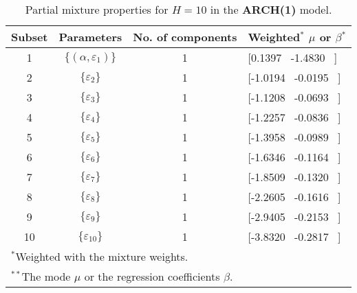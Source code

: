 \footnotesize{  
{ \renewcommand{\arraystretch}{1.3} 
\begin{longtable}{cccp{3.6cm}} 
\caption{Partial mixture properties for $H=10$ in the \textbf{ARCH(1)} model.} 
\label{tab:pmits_arch} \\ 
 Subset & Parameters & No. of components  & Weighted$^{*}$ $\mu$ or $\beta$$^{*}$ \\ \hline 
1 & $\{(\alpha,\varepsilon_{1})\}$ & 1 & [0.1397 \, -1.4830 \, ]   \\ [1ex] 
2 & $\{\varepsilon_{2}\}$ & 1 & [-1.0194 \, -0.0195 \, ]   \\ [1ex] 
3 & $\{\varepsilon_{3}\}$ & 1 & [-1.1208 \, -0.0693 \, ]   \\ [1ex] 
4 & $\{\varepsilon_{4}\}$ & 1 & [-1.2257 \, -0.0836 \, ]   \\ [1ex] 
5 & $\{\varepsilon_{5}\}$ & 1 & [-1.3958 \, -0.0989 \, ]   \\ [1ex] 
6 & $\{\varepsilon_{6}\}$ & 1 & [-1.6346 \, -0.1164 \, ]   \\ [1ex] 
7 & $\{\varepsilon_{7}\}$ & 1 & [-1.8509 \, -0.1320 \, ]   \\ [1ex] 
8 & $\{\varepsilon_{8}\}$ & 1 & [-2.2605 \, -0.1616 \, ]   \\ [1ex] 
9 & $\{\varepsilon_{9}\}$ & 1 & [-2.9405 \, -0.2153 \, ]   \\ [1ex] 
10 & $\{\varepsilon_{10}\}$ & 1 & [-3.8320 \, -0.2817 \, ]   \\ [1ex] 
\hline 
 \multicolumn{4}{l}{\footnotesize{$^{*}$Weighted with the mixture weights.}} \\ 
 \multicolumn{4}{l}{\footnotesize{$^{**}$The mode $\mu$ or the regression coefficients $\beta$.}} \\ 
\end{longtable} 
} 
} 
